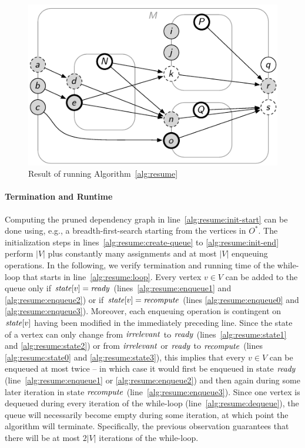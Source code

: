 \documentclass[paper=letter,fontsize=11pt,captions=tableheading]{scrartcl}
\numberwithin{equation}{section}
\theoremstyle{algorithm}
\theoremstyle{plain}
\theoremstyle{nonumberplain}
\begin{document}
\begin{figure}[htb]
	\centering
	\includegraphics{compute-resume-state-result}
	\caption{Result of running Algorithm~\ref{alg:resume} \label{fig:compute-resume-state-result}}
\end{figure}

\paragraph{Termination and Runtime}

Computing the pruned dependency graph in line~\ref{alg:resume:init-start} can be done using, e.g., a breadth-first-search starting from the vertices in $O^*$. The initialization steps in lines~\ref{alg:resume:create-queue} to \ref{alg:resume:init-end} perform $|V|$ plus constantly many assignments and at most $|V|$ enqueuing operations. In the following, we verify termination and running time of the while-loop that starts in line~\ref{alg:resume:loop}. Every vertex $v \in V$ can be added to the queue only if $\mathit{state}[v] = \mathit{ready}$ (lines~\ref{alg:resume:enqueue1} and \ref{alg:resume:enqueue2}) or if $\mathit{state}[v] = \mathit{recompute}$ (lines \ref{alg:resume:enqueue0} and \ref{alg:resume:enqueue3}). Moreover, each enqueuing operation is contingent on $\mathit{state}[v]$ having been modified in the immediately preceding line. Since the state of a vertex can only change from $\mathit{irrelevant}$ to $\mathit{ready}$ (lines~\ref{alg:resume:state1} and \ref{alg:resume:state2}) or from $\mathit{irrelevant}$ or $\mathit{ready}$ to $\mathit{recompute}$ (lines \ref{alg:resume:state0} and \ref{alg:resume:state3}), this implies that every $v \in V$ can be enqueued at most twice -- in which case it would first be enqueued in state $\mathit{ready}$ (line~\ref{alg:resume:enqueue1} or \ref{alg:resume:enqueue2}) and then again during some later iteration in state $\mathit{recompute}$ (line~\ref{alg:resume:enqueue3}). Since one vertex is dequeued during every iteration of the while-loop (line~\ref{alg:resume:dequeue}), the queue will necessarily become empty during some iteration, at which point the algorithm will terminate. Specifically, the previous observation guarantees that there will be at most $2 |V|$ iterations of the while-loop.
\end{document}
